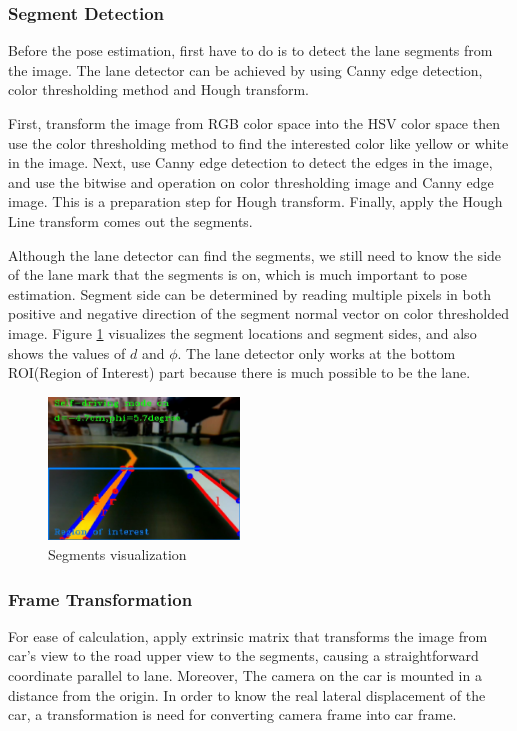 \documentclass[conference]{IEEEtran}
\begin{document}
\subsubsection{Segment Detection}

Before the pose estimation, first have to do is to detect the lane segments from the image. The lane detector can be achieved by using Canny edge detection, color thresholding method and Hough transform.

First, transform the image from RGB color space into the HSV color space then use the color thresholding method to find the interested color like yellow or white in the image. Next, use Canny edge detection to detect the edges in the image, and use the bitwise and operation on color thresholding image and Canny edge image. This is a preparation step for Hough transform. Finally, apply the Hough Line transform comes out the segments.
 
Although the lane detector can find the segments, we still need to know the side of the lane mark that the segments is on, which is much important to pose estimation. Segment side can be determined by reading multiple pixels in both positive and negative direction of the segment normal vector on color thresholded image. Figure \ref{fig:lane_detect} visualizes the segment locations and segment sides, and also shows the values of $d$ and $\phi$. The lane detector only works at the bottom ROI(Region of Interest) part because there is much possible to be the lane.

\begin{figure}
\centering
\includegraphics[width=2in]{img/lane_detect.png}
\caption{Segments visualization}
\label{fig:lane_detect}
\end{figure}

\subsubsection{Frame Transformation}

For ease of calculation, apply extrinsic matrix that transforms the image from car's view to the road upper view  to the segments, causing a straightforward coordinate parallel to lane.
Moreover, The camera on the car is mounted in a distance from the origin. In order to know the real lateral displacement of the car, a transformation is need for converting camera frame into car frame.
\end{document}
